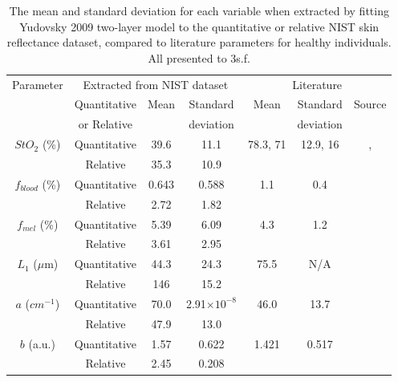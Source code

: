 \begin{table}[h]
    \centering
    \caption{The mean and standard deviation for each variable when extracted by fitting Yudovsky 2009 two-layer model to the quantitative or relative NIST skin reflectance dataset, compared to literature parameters for healthy individuals. All presented to 3s.f.}
    \begin{tabular}{|c|ccc|ccc|}
        \hline
        \multirow{2}{*}{Parameter} & \multicolumn{3}{c}{Extracted from NIST dataset} & \multicolumn{3}{|c|}{Literature} \\
        \cline{2-7}
         & Quantitative & \multirow{2}{*}{Mean} & Standard & \multirow{2}{*}{Mean} & Standard & \multirow{2}{*}{Source} \\
         & or Relative &  & deviation &  & deviation &  \\
        \hline
        \multirow{2}{*}{$StO_2$ (\%)} & Quantitative & 39.6 & 11.1 & \multirow{2}{*}{78.3, 71} & \multirow{2}{*}{12.9, 16} & \multirow{2}{*}{\cite{VanManen2021}, \cite{Nishidate2011}} \\ %
        & Relative & 35.3 & 10.9 & & & \\ %
        \hline
        $f_{blood}$ (\%) & Quantitative & 0.643 & 0.588 & \multirow{2}{*}{1.1} & \multirow{2}{*}{0.4} & \multirow{2}{*}{\cite{Nishidate2011}} \\ %
        & Relative & 2.72 & 1.82 & & & \\
        \hline
        $f_{mel}$ (\%) & Quantitative & 5.39 & 6.09 & \multirow{2}{*}{4.3} & \multirow{2}{*}{1.2} & \multirow{2}{*}{\cite{Nishidate2011}} \\ %
        & Relative & 3.61 & 2.95 & & &  \\
        \hline
        $L_1$ ($\mu$m) & Quantitative & 44.3 & 24.3 & \multirow{2}{*}{75.5} & \multirow{2}{*}{N/A} & \multirow{2}{*}{\cite{Lintzeri2022}} \\ %
        & Relative & 146 & 15.2 & & &  \\
        \hline
        $a$ (\textrm{$cm^{-1}$}) & Quantitative & 70.0 & 2.91$\times 10^{-8}$ & \multirow{2}{*}{46.0} & \multirow{2}{*}{13.7} & \multirow{2}{*}{\cite{Jacques2013}} \\ %
        & Relative & 47.9 & 13.0 & & &  \\
        \hline
        $b$ (a.u.) & Quantitative & 1.57 & 0.622 & \multirow{2}{*}{1.421} & \multirow{2}{*}{0.517} & \multirow{2}{*}{\cite{Jacques2013}} \\ %
        & Relative & 2.45 & 0.208 & & &  \\
        \hline
    \end{tabular}
    \label{tb:NISTparams}
\end{table}
